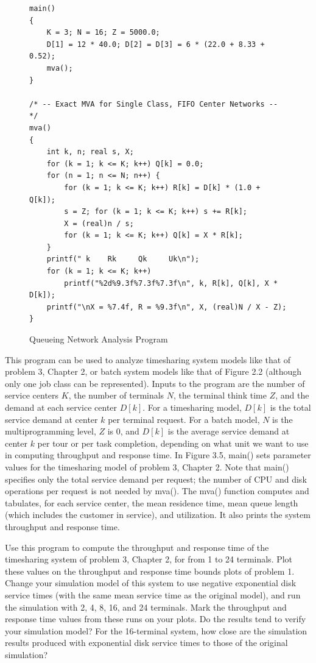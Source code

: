 \begin{enumerate}
\begin{figure}[ht]
\begin{verbatim}
main()
{
    K = 3; N = 16; Z = 5000.0;
    D[1] = 12 * 40.0; D[2] = D[3] = 6 * (22.0 + 8.33 + 0.52);
    mva();
}

/* -- Exact MVA for Single Class, FIFO Center Networks -- */
mva()
{
    int k, n; real s, X;
    for (k = 1; k <= K; k++) Q[k] = 0.0;
    for (n = 1; n <= N; n++) {
        for (k = 1; k <= K; k++) R[k] = D[k] * (1.0 + Q[k]);
        s = Z; for (k = 1; k <= K; k++) s += R[k];
        X = (real)n / s;
        for (k = 1; k <= K; k++) Q[k] = X * R[k];
    }
    printf(" k    Rk     Qk     Uk\n");
    for (k = 1; k <= K; k++)
        printf("%2d%9.3f%7.3f%7.3f\n", k, R[k], Q[k], X * D[k]);
    printf("\nX = %7.4f, R = %9.3f\n", X, (real)N / X - Z);
}
\end{verbatim}
\endgroup
\caption{Queueing Network Analysis Program}
\end{figure}

This program can be used to analyze timesharing system models like that of
problem 3, Chapter 2, or batch system models like that of Figure 2.2 (although
only one job class can be represented). Inputs to the program are the number
of service centers $K$, the number of terminals $N$, the terminal think time
$Z$, and the demand at each service center $D[k]$. For a timesharing model,
$D[k]$ is the total service demand at center $k$ per terminal request. For a
batch model, $N$ is the multiprogramming level, $Z$ is 0, and $D[k]$ is the
average service demand at center $k$ per tour or per task completion,
depending on what unit we want to use in computing throughput and response
time. In Figure 3.5, main() sets parameter values for the timesharing model of
problem 3, Chapter 2. Note that main() specifies only the total service demand
per request; the number of CPU and disk operations per request is not needed
by mva(). The mva() function computes and tabulates, for each service center,
the mean residence time, mean queue length (which includes the customer in
service), and utilization. It also prints the system throughput and response
time.

Use this program to compute the throughput and response time of the
 timesharing system of problem 3, Chapter 2, for from 1 to 24 terminals. Plot
these values on the throughput and response time bounds plots of problem 1.
Change your simulation model of this system to use negative exponential disk
service times (with the same mean service time as the original model), and run
 the simulation with 2, 4, 8, 16, and 24 terminals. Mark the throughput and
response time values from these runs on your plots. Do the results tend to
verify your simulation model? For the 16-terminal system, how close are the
simulation results produced with exponential disk service times to those of
the original simulation?


\end{enumerate}
